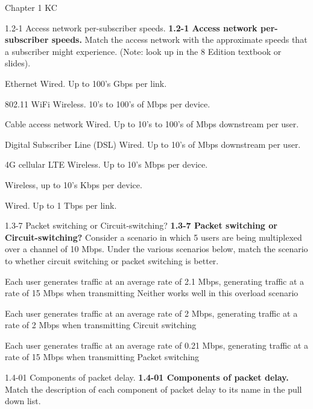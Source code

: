\documentclass[a4paper]{article}
\begin{document}
\begin{quiz}{Chapter 1 KC}

\begin{matching}[points=1]{1.2-1 Access network per-subscriber speeds.}
\textbf{1.2-1 Access network per-subscriber speeds.}
Match the access network with the approximate speeds that a subscriber might experience. 
(Note: look up in the 8 Edition textbook or slides).

\item Ethernet \answer Wired. Up to 100's Gbps per link.
\item 802.11 WiFi \answer Wireless. 10’s to 100’s of Mbps per device.
\item Cable access network \answer Wired. Up to 10’s to 100’s of Mbps downstream per user.
\item Digital Subscriber Line (DSL) \answer Wired. Up to 10’s of Mbps downstream per user.
\item 4G cellular LTE \answer Wireless. Up to 10’s Mbps per device.
\item \answer Wireless, up to 10's Kbps per device.
\item \answer Wired. Up to 1 Tbps per link.
\end{matching}

\begin{matching}[points=1]{1.3-7 Packet switching or Circuit-switching?}
\textbf{1.3-7 Packet switching or Circuit-switching?}
Consider a scenario in which 5 users are being multiplexed over a channel of 10 Mbps.  
Under the various scenarios below, match the scenario to whether circuit switching or packet switching is better.

\item Each user generates traffic at an average rate of 2.1 Mbps, generating traffic at a rate of 15 Mbps when transmitting \answer Neither works well in this overload scenario
\item Each user generates traffic at an average rate of 2 Mbps, generating traffic at a rate of 2 Mbps when transmitting \answer Circuit switching
\item Each user generates traffic at an average rate of 0.21 Mbps, generating traffic at a rate of 15 Mbps when transmitting \answer Packet switching
\end{matching}

\begin{matching}[points=1]{1.4-01 Components of packet delay.}
\textbf{1.4-01 Components of packet delay.}
Match the description of each component of packet delay to its name in the pull down list.


\end{matching}
\end{quiz}
\end{document}
